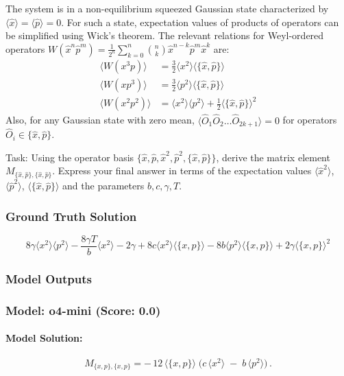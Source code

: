 \documentclass[10pt]{article}
\begin{document}
The system is in a non-equilibrium squeezed Gaussian state characterized by $\langle \hat{x} \rangle = \langle \hat{p} \rangle = 0$. For such a state, expectation values of products of operators can be simplified using Wick's theorem. The relevant relations for Weyl-ordered operators $W(\hat{x}^n\hat{p}^m)=\frac{1}{2^n}\sum_{k=0}^n\binom{n}{k}\hat{x}^{n-k}\hat{p}^m\hat{x}^k$ are:
\begin{align*}
\langle W(x^3 p) \rangle &= \frac{3}{2} \langle x^2 \rangle \langle \{ \hat x,\hat p\} \rangle \\
\langle W(x p^3) \rangle &= \frac{3}{2} \langle p^2 \rangle \langle \{ \hat x,\hat p\} \rangle \\
\langle W(x^2p^2) \rangle &= \langle x^2\rangle \langle p^2\rangle + \frac{1}{2} \langle \{ \hat x,\hat p\} \rangle^2
\end{align*}
Also, for any Gaussian state with zero mean, $\langle \hat{O}_1 \hat{O}_2 \dots \hat{O}_{2k+1} \rangle = 0$ for operators $\hat{O}_i \in \{\hat{x}, \hat{p}\}$.

Task:
Using the operator basis $\{\hat{x}, \hat{p}, \hat{x}^2, \hat{p}^2, \{\hat{x},\hat{p}\}\}$, derive the matrix element $M_{\{\hat{x},\hat{p}\}, \{\hat{x},\hat{p}\}}$. Express your final answer in terms of the expectation values $\langle \hat{x}^2 \rangle$, $\langle \hat{p}^2 \rangle$, $\langle \{\hat{x},\hat{p}\} \rangle$ and the parameters $b, c, \gamma, T$.

\subsubsection*{Ground Truth Solution}
\[ \boxed{8 \gamma \langle x^2 \rangle \langle p^2 \rangle - \frac{8 \gamma T}{b} \langle x^2 \rangle - 2 \gamma + 8 c \langle x^2 \rangle \langle \{x, p\} \rangle - 8 b \langle p^2 \rangle \langle \{x, p\} \rangle + 2 \gamma \langle \{x, p\} \rangle^2} \]

\subsubsection*{Model Outputs}
\subsubsection*{Model: o4-mini (Score: 0.0)}
\paragraph*{Model Solution:}
\[ M_{\{x,p\},\{x,p\}}
=-\,12\,\langle\{x,p\}\rangle\;\bigl(c\,\langle x^2\rangle \;-\;b\,\langle p^2\rangle\bigr)\,. \]
\end{document}
